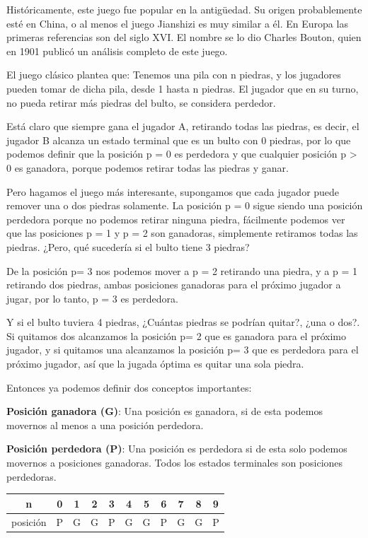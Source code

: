 Históricamente, este juego fue popular en la antigüedad. Su origen probablemente esté en China, o al menos el juego Jianshizi es muy similar a él. En Europa las primeras referencias son del siglo XVI. El nombre se lo dio Charles Bouton, quien en 1901 publicó un análisis completo de este juego.

El juego clásico plantea que: Tenemos una pila con n piedras, y los jugadores pueden tomar de dicha pila, desde 1 hasta n piedras. El jugador que en su turno, no pueda retirar más piedras del bulto, se considera perdedor.

Está claro que siempre gana el jugador A, retirando todas las piedras, es decir, el jugador B alcanza un estado terminal que es un bulto con 0 piedras, por lo que podemos definir que la posición p = 0 es perdedora y que cualquier posición p > 0 es ganadora, porque podemos retirar todas las piedras y ganar.

Pero hagamos el juego más interesante, supongamos que cada jugador puede remover una o dos piedras solamente. La posición p = 0 sigue siendo una posición perdedora porque no podemos retirar ninguna piedra, fácilmente podemos ver que las posiciones p = 1 y p = 2 son ganadoras, simplemente retiramos todas las piedras. ¿Pero, qué sucedería si el bulto tiene 3 piedras?

De la posición p= 3 nos podemos mover a p = 2 retirando una piedra, y a p = 1 retirando dos piedras, ambas posiciones ganadoras para el próximo jugador a jugar, por lo tanto, p = 3 es perdedora.

Y si el bulto tuviera 4 piedras, ¿Cuántas piedras se podrían quitar?, ¿una o dos?. Si quitamos dos alcanzamos la posición p= 2 que es ganadora para el próximo jugador, y si quitamos una alcanzamos la posición p= 3 que es perdedora para el próximo jugador, así que la jugada óptima es quitar una sola piedra.

Entonces ya podemos definir dos conceptos importantes:

\textbf{Posición ganadora (G)}: Una posición es ganadora, si de esta podemos movernos al menos a una posición perdedora.

\textbf{Posición perdedora (P)}: Una posición es perdedora si de esta solo podemos movernos a posiciones ganadoras. Todos los estados terminales son posiciones perdedoras.

\begin{tabular}{|c|c|c|c|c|c|c|c|c|c|c|}
	\hline 
	n & 0 & 1 & 2 & 3 & 4 & 5 & 6 & 7 & 8 & 9  \\ 
	\hline 
	posición & P & G & G & P & G & G & P & G & G & P  \\ 
	\hline 
	
\end{tabular} 

